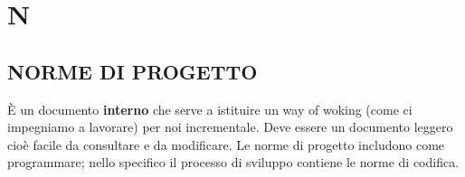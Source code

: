 \newpage
	\flushright{\hyperref[index]{\color{black!65}{Ritorna all'indice}}}\flushleft
	\section{N} \label{sec:N}
	
		\subsection{NORME DI PROGETTO}	 \label{norme} %
		È un documento \textbf{interno} che serve a istituire un way of woking (come ci impegniamo a lavorare) per noi incrementale. Deve essere un documento leggero cioè facile da consultare e da modificare.
		Le norme di progetto includono come programmare; nello specifico il processo di sviluppo contiene le norme di codifica.
		
		
